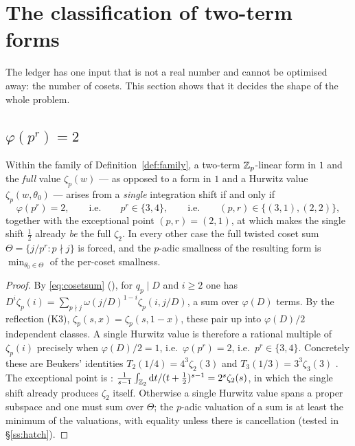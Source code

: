 \section{The classification of two-term forms}\label{sec:classification}

The ledger has one input that is not a real number and cannot be optimised away: the number
of cosets. This section shows that it decides the shape of the whole problem.

\subsection{\texorpdfstring{$\varphi(p^r)=2$}{phi(p^r)=2}}\label{ss:phi2}

\begin{theorem}\label{thm:classification}
\PROVED{} Within the family of Definition~\ref{def:family}, a two-term $\mathbb{Z}_p$-linear form in
$1$ and the \emph{full} value $\zeta_p(w)$ --- as opposed to a form in $1$ and a Hurwitz
value $\zeta_p(w,\theta_0)$ --- arises from a \emph{single} integration shift if and only if
\[
 \varphi(p^r)=2,\qquad\text{i.e.}\qquad p^r\in\{3,4\},\qquad\text{i.e.}\qquad
 (p,r)\in\{(3,1),(2,2)\},
\]
together with the exceptional point $(p,r)=(2,1)$, at which
\cite[Lemma 9]{LSZ2025} makes the single shift $\tfrac12$ already \emph{be} the full
$\zeta_2$. In every other case the full twisted coset sum
$\Theta=\{j/p^r:p\nmid j\}$ is forced, and the $p$-adic smallness of the resulting form is
$\min_{\theta_0\in\Theta}$ of the per-coset smallness.
\end{theorem}

\begin{proof}
By \eqref{eq:cosetsum} (\cite[Lemma 12]{LaiSprang2023}), for $q_p\mid D$ and $i\ge2$ one has
$D^i\zeta_p(i)=\sum_{p\nmid j}\omega(j/D)^{1-i}\zeta_p(i,j/D)$, a sum over $\varphi(D)$
terms. By the reflection (K3), $\zeta_p(s,x)=\zeta_p(s,1-x)$, these pair up into
$\varphi(D)/2$ independent classes. A single Hurwitz value is therefore a rational multiple
of $\zeta_p(i)$ precisely when $\varphi(D)/2=1$, i.e.\ $\varphi(p^r)=2$, i.e.\
$p^r\in\{3,4\}$. Concretely these are Beukers' identities
$T_2(1/4)=4^3\zeta_2(3)$ and $T_3(1/3)=3^3\zeta_3(3)$
\cite[Prop.~5.2]{Beukers2008}. The exceptional point is
\cite[Lemma 9]{LSZ2025}: $\frac1{s-1}\int_{\mathbb{Z}_2}\mathrm{d} t/(t+\tfrac12)^{s-1}=2^s\zeta_2(s)$,
in which the single shift already produces $\zeta_2$ itself. Otherwise a single Hurwitz
value spans a proper subspace and one must sum over $\Theta$; the $p$-adic valuation of a
sum is at least the minimum of the valuations, with equality unless there is cancellation
(tested in \S\ref{ss:hatch}).
\end{proof}

